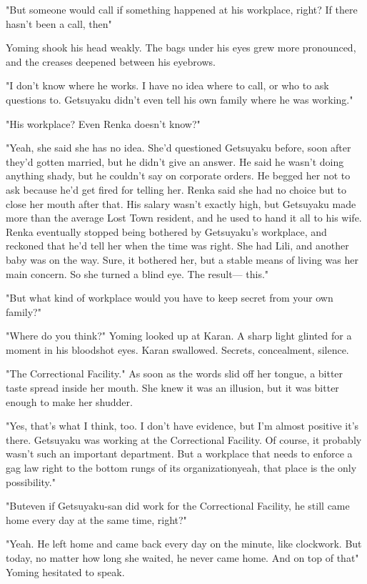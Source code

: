 "But someone would call if something happened at his workplace, right?
If there hasn't been a call, then\el "

Yoming shook his head weakly. The bags under his eyes grew more
pronounced, and the creases deepened between his eyebrows.

"I don't know where he works. I have no idea where to call, or who to
ask questions to. Getsuyaku didn't even tell his own family where he was
working."

"His workplace? Even Renka doesn't know?"

"Yeah, she said she has no idea. She'd questioned Getsuyaku before, soon
after they'd gotten married, but he didn't give an answer. He said he
wasn't doing anything shady, but he couldn't say on corporate orders. He
begged her not to ask because he'd get fired for telling her. Renka said
she had no choice but to close her mouth after that. His salary wasn't
exactly high, but Getsuyaku made more than the average Lost Town
resident, and he used to hand it all to his wife. Renka eventually
stopped being bothered by Getsuyaku's workplace, and reckoned that he'd
tell her when the time was right. She had Lili, and another baby was on
the way. Sure, it bothered her, but a stable means of living was her
main concern. So she turned a blind eye. The result--- this."

"But what kind of workplace would you have to keep secret from your own
family?"

"Where do you think?" Yoming looked up at Karan. A sharp light glinted
for a moment in his bloodshot eyes. Karan swallowed. Secrets,
concealment, silence.

"The Correctional Facility." As soon as the words slid off her tongue, a
bitter taste spread inside her mouth. She knew it was an illusion, but
it was bitter enough to make her shudder.

"Yes, that's what I think, too. I don't have evidence, but I'm almost
positive it's there. Getsuyaku was working at the Correctional Facility.
Of course, it probably wasn't such an important department. But a
workplace that needs to enforce a gag law right to the bottom rungs of
its organization\el yeah, that place is the only possibility."

"But\el even if Getsuyaku-san did work for the Correctional Facility, he
still came home every day at the same time, right?"

"Yeah. He left home and came back every day on the minute, like
clockwork. But today, no matter how long she waited, he never came home.
And on top of that\el " Yoming hesitated to speak.

